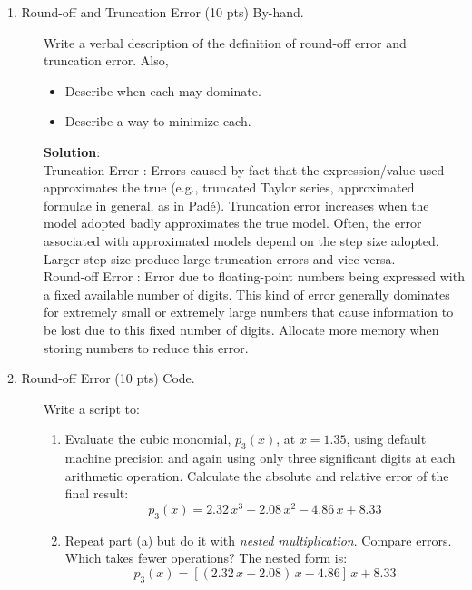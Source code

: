 \documentclass[12pt]{article}
\begin{document}
\begin{description}
\item[1. Round-off and Truncation Error (10 pts) By-hand.] Write a verbal description of the definition of round-off error and truncation error. Also,
    \begin{itemize}
   	\item Describe when each may dominate.
   	\item Describe a way to minimize each.
    \end{itemize}
    
    \color{red}
    \ifsolution
    {\bf Solution}:\\ Truncation Error : Errors caused by fact that the expression/value used approximates the true (e.g., truncated Taylor series, approximated formulae in general, as in Pad\'e). Truncation error increases when the model adopted badly approximates the true model. Often, the error associated with approximated models depend on the step size adopted. Larger step size produce large truncation errors and vice-versa.\\ Round-off Error : Error due to floating-point numbers being expressed with a fixed available number of digits. This kind of error generally dominates for extremely small or extremely large numbers that cause information to be lost due to this fixed number of digits. Allocate more memory when storing numbers to reduce this error.
    \fi
    \color{black}

\item[2. Round-off Error (10 pts) Code.] Write a script to:
\begin{enumerate}[label=\textbf{(\alph*)}]
\item Evaluate the cubic monomial, $p_3 (x)$, at $x = 1.35$, using default machine precision and again using only three significant digits at each arithmetic operation. Calculate the absolute and relative error of the final result:
    \begin{equation*}
        p_3 (x) = 2.32 \, x^3 + 2.08 \, x^2 - 4.86 \, x + 8.33
    \end{equation*}
    \item Repeat part (a) but do it with \emph{nested multiplication}. Compare errors. Which takes fewer operations? The nested form is:
    \begin{equation*}
        p_3 (x) = [(2.32 \, x + 2.08) \, x - 4.86] \, x + 8.33
    \end{equation*}
    \end{enumerate}
    

\end{description}
\end{document}

